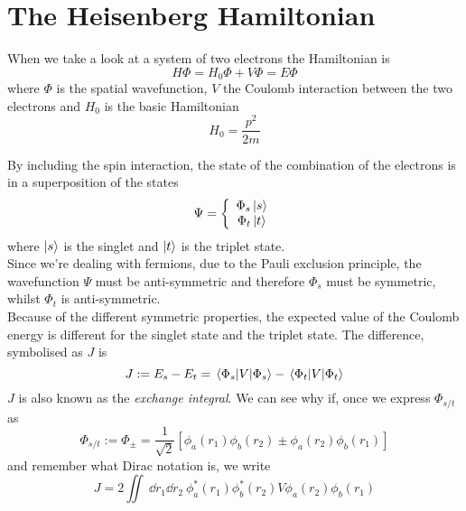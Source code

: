 \documentclass[../main.tex]{subfiles}
\begin{document}
\chapter{The Heisenberg Hamiltonian}

When we take a look at a system of two electrons the Hamiltonian is
\begin{equation}
    H\Phi=H_{0}\Phi+V\Phi=E\Phi
\end{equation}
where $\Phi$ is the spatial wavefunction, $V$ the Coulomb interaction between the two electrons and $H_{0}$ is the basic Hamiltonian
\begin{equation}
    H_{0}=\frac{p^{2}}{2m}
\end{equation}

By including the spin interaction, the state of the combination of the electrons is in a superposition of the states
\begin{equation}
    \Psi=\left\{ \begin{array}{cc}
        \Phi_{s}\ket{s}  \\
        \Phi_{t}\ket{t}
    \end{array} \right.
\end{equation}
where $\ket{s}$ is the singlet and $\ket{t}$ is the triplet state.\\

Since we're dealing with fermions, due to the Pauli exclusion principle, the wavefunction $\Psi$ must be anti-symmetric and therefore $\Phi_{s}$ must be symmetric, whilst $\Phi_{t}$ is anti-symmetric.\\

Because of the different symmetric properties, the expected value of the Coulomb energy is different for the singlet state and the triplet state. The difference, symbolised as $J$ is 
\begin{equation}
    J:=E_{s}-E_{t}=\expval{V}{\Phi_{s}}-\expval{V}{\Phi_{t}}
\end{equation}
$J$ is also known as the \textit{exchange integral}. We can see why if, once we express $\Phi_{s/t}$ as
\begin{equation}
    \Phi_{s/t}:=\Phi_{\pm}=\frac{1}{\sqrt{2}}\left[\phi_{a}(r_{1})\phi_{b}(r_{2})\pm\phi_{a}(r_{2})\phi_{b}(r_{1})\right]
\end{equation}
and remember what Dirac notation is, we write
\begin{equation}
    J=2\iint\ \dd r_{1}\dd r_{2}\ \phi_{a}^{*}(r_{1})\phi_{b}^{*}(r_{2})V\phi_{a}(r_{2})\phi_{b}(r_{1})
\end{equation}
\end{document}
